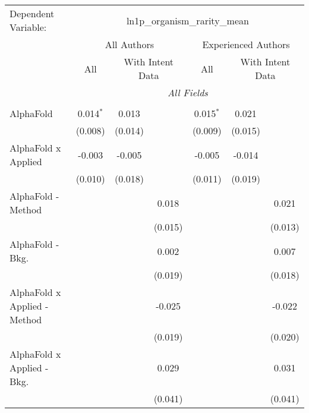 \begingroup
\centering
\begin{tabular}{lcccccc}
   \tabularnewline \midrule \midrule
   Dependent Variable: & \multicolumn{6}{c}{ln1p\_organism\_rarity\_mean}\\
 & \multicolumn{3}{c}{All Authors} & \multicolumn{3}{c}{Experienced Authors} \\
\cmidrule(lr){2-4} \cmidrule(lr){5-7}
 & \multicolumn{1}{c}{All} & \multicolumn{2}{c}{With Intent Data} & \multicolumn{1}{c}{All} & \multicolumn{2}{c}{With Intent Data} \\
\cmidrule(lr){2-2} \cmidrule(lr){3-4} \cmidrule(lr){5-5} \cmidrule(lr){6-7}
 & \multicolumn{6}{c}{\textit{All Fields}} \\ \\
   AlphaFold                      & 0.014$^{*}$ & 0.013         &              & 0.015$^{*}$ & 0.021       &   \\   
                                  & (0.008)     & (0.014)       &              & (0.009)     & (0.015)     &   \\   
   AlphaFold x Applied            & -0.003      & -0.005        &              & -0.005      & -0.014      &   \\   
                                  & (0.010)     & (0.018)       &              & (0.011)     & (0.019)     &   \\   
   AlphaFold - Method             &             &               & 0.018        &             &             & 0.021\\   
                                  &             &               & (0.015)      &             &             & (0.013)\\   
   AlphaFold - Bkg.               &             &               & 0.002        &             &             & 0.007\\   
                                  &             &               & (0.019)      &             &             & (0.018)\\   
   AlphaFold x Applied - Method   &             &               & -0.025       &             &             & -0.022\\   
                                  &             &               & (0.019)      &             &             & (0.020)\\   
   AlphaFold x Applied - Bkg.     &             &               & 0.029        &             &             & 0.031\\   
                                  &             &               & (0.041)      &             &             & (0.041)\\   

\end{tabular}
